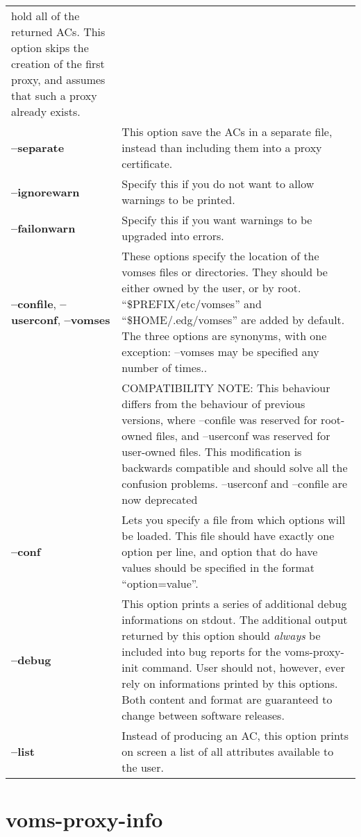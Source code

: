 \documentclass[a4paper]{book}
\begin{document}
\begin{longtable}{lp{3in}}
		      hold all of the returned ACs.  This option skips
		      the creation of the first proxy, and assumes
		      that such a proxy already exists.\\
\textbf{--separate} & This option save the ACs in a separate file,
		      instead than including them into a proxy
		      certificate.\\ 
\textbf{--ignorewarn} & Specify this if you do not want to allow
		      warnings to be printed.\\
\textbf{--failonwarn} & Specify this if you want warnings to be
		      upgraded into errors.\\
\textbf{--confile}, 
\textbf{--userconf},
\textbf{--vomses} & These options specify the location of the vomses files or directories.
                    They should be either owned by the user, or by root. ``\$PREFIX/etc/vomses''
                    and ``\$HOME/.edg/vomses'' are added by default.  The three options are synonyms,
                    with one exception: --vomses may be specified any number of times..\\
\                 & COMPATIBILITY NOTE: This behaviour differs from the behaviour of previous versions,
                    where --confile was reserved for root-owned files, and --userconf was reserved for
                    user-owned files. This modification is backwards compatible and should solve all
                    the confusion problems. --userconf and --confile are now deprecated\\
\textbf{--conf}     & Lets you specify a file from which options will
		      be loaded.  This file should have exactly one
		      option per line, and option that do have values
		      should be specified in the format
		      ``option=value''.\\ 
\textbf{--debug}    & This option prints a series of additional debug
		      informations on stdout.  The additional output
		      returned by this option should \emph{always} be
		      included into bug reports for the
		      voms-proxy-init command.  User should not,
		      however, ever rely on informations printed by
		      this options.  Both content and format are
		      guaranteed to change between software
		      releases.\\
\textbf{--list} & Instead of producing an AC, this option prints on screen
          a list of all attributes available to the user.\\
\end{longtable}

\chapter{voms-proxy-info}
\end{document}
